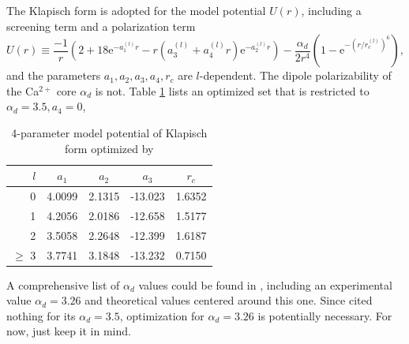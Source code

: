 \documentclass{article}
\newcommand{\e}{\mathrm{e}}
\begin{document}
The Klapisch form is adopted for the model potential $U(r)$, including a screening term and a polarization term
\begin{equation}
U(r) \equiv \frac{-1}{r}(2+18\e^{-a_1^{(l)} r} - r(a_3^{(l)} + a_4^{(l)}r)\e^{-a_2^{(l)}r}) - \frac{\alpha_d}{2r^4}(1-\e^{-(r/r_c^{(l)})^6}),
\end{equation}
and the parameters $a_1, a_2, a_3, a_4, r_c$ are $l$-dependent. The dipole polarizability of the Ca${}^{2+}$ core $\alpha_d$ is not. Table \ref{tab:Aymar1991} lists an optimized set that is restricted to $\alpha_d=3.5, a_4=0$,
\begin{table}[htbp]
\caption{4-parameter model potential of Klapisch form optimized by \cite{Aymar_1991}} \label{tab:Aymar1991}
\centering
\begin{tabular}{r|cccc}
\hline\hline
$l$ & $a_1$ & $a_2$ &$a_3$ &		$r_c$ \\ \hline
0 & 4.0099	& 2.1315 &	-13.023 &	1.6352	\\ \hline
1 & 4.2056	& 2.0186	&	-12.658 & 1.5177 	\\ \hline
2 & 3.5058	& 2.2648	& 	-12.399 & 1.6187	\\ \hline
$\geq$ 3 & 3.7741	& 3.1848	&-13.232&0.7150	\\ \hline
\end{tabular}
\end{table}
A comprehensive list of $\alpha_d$ values could be found in \cite{PhysRevA.88.062504}, including an experimental value \cite{UOpik_1967} $\alpha_d=3.26$ and theoretical values centered around this one. Since \cite{Aymar_1991} cited nothing for its $\alpha_d=3.5$, optimization for $\alpha_d=3.26$ is potentially necessary. For now, just keep it in mind.
\end{document}
